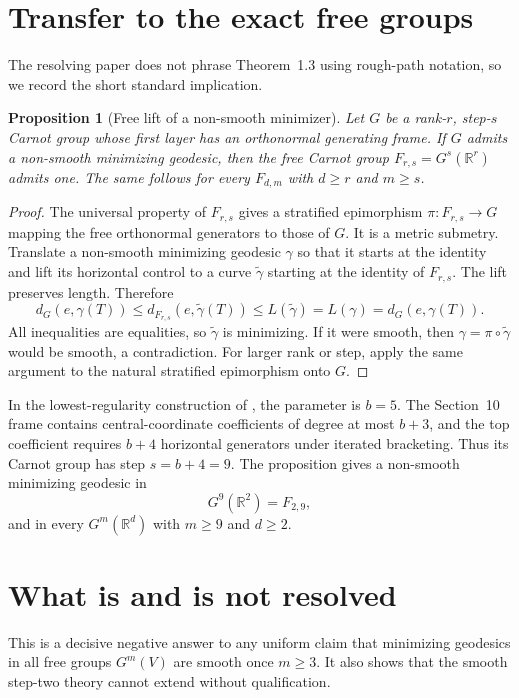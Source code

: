 \documentclass[11pt]{article}
\newtheorem{proposition}{Proposition}
\begin{document}
\section{Transfer to the exact free groups}

The resolving paper does not phrase Theorem~1.3 using rough-path notation,
so we record the short standard implication.

\begin{proposition}[Free lift of a non-smooth minimizer]
Let $G$ be a rank-$r$, step-$s$ Carnot group whose first layer has an
orthonormal generating frame.  If $G$ admits a non-smooth minimizing
geodesic, then the free Carnot group $F_{r,s}=G^s(\mathbb R^r)$ admits one.
The same follows for every $F_{d,m}$ with $d\geq r$ and $m\geq s$.
\end{proposition}

\begin{proof}
The universal property of $F_{r,s}$ gives a stratified epimorphism
$\pi:F_{r,s}\to G$ mapping the free orthonormal generators to those of $G$.
It is a metric submetry.  Translate a non-smooth minimizing geodesic
$\gamma$ so that it starts at the identity and lift its horizontal control
to a curve $\widetilde\gamma$ starting at the identity of $F_{r,s}$.
The lift preserves length.  Therefore
\[
 d_G(e,\gamma(T))
 \leq d_{F_{r,s}}(e,\widetilde\gamma(T))
 \leq L(\widetilde\gamma)
 =L(\gamma)=d_G(e,\gamma(T)).
\]
All inequalities are equalities, so $\widetilde\gamma$ is minimizing.  If it
were smooth, then $\gamma=\pi\circ\widetilde\gamma$ would be smooth, a
contradiction.  For larger rank or step, apply the same argument to the
natural stratified epimorphism onto $G$.
\end{proof}

In the lowest-regularity construction of \cite{answer}, the parameter is
$b=5$.  The Section~10 frame contains central-coordinate coefficients of
degree at most $b+3$, and the top coefficient requires $b+4$ horizontal
generators under iterated bracketing.  Thus its Carnot group has step
$s=b+4=9$.  The proposition gives a non-smooth minimizing geodesic in
\[
 G^9(\mathbb R^2)=F_{2,9},
\]
and in every $G^m(\mathbb R^d)$ with $m\geq9$ and $d\geq2$.

\section{What is and is not resolved}

This is a decisive negative answer to any uniform claim that minimizing
geodesics in all free groups $G^m(V)$ are smooth once $m\geq3$.  It also
shows that the smooth step-two theory cannot extend without qualification.
\end{document}
